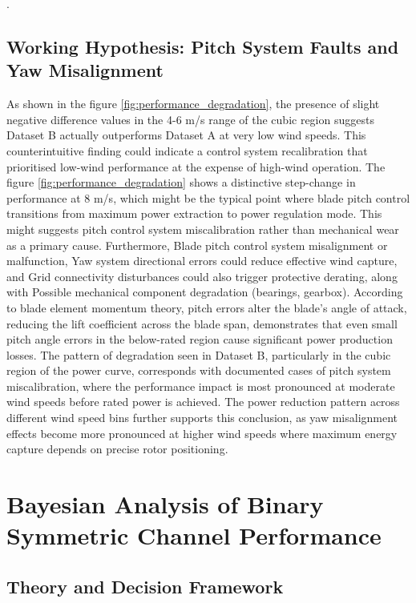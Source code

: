 .\documentclass[a4paper,11pt]{article}
\begin{document}
\subsection*{Working Hypothesis: Pitch System Faults and Yaw Misalignment}
As shown in the figure \ref{fig:performance_degradation}, the presence of slight negative difference values in the 4-6 m/s range of the cubic region suggests Dataset B actually outperforms Dataset A at very low wind speeds. This counterintuitive finding could indicate a control system recalibration that prioritised low-wind performance at the expense of high-wind operation. The  figure \ref{fig:performance_degradation} shows a distinctive step-change in performance at 8 m/s, which might be the typical point where blade pitch control transitions from maximum power extraction to power regulation mode. This might suggests pitch control system miscalibration rather than mechanical wear as a primary cause. Furthermore, Blade pitch control system misalignment or malfunction, Yaw system directional errors could reduce effective wind capture, and Grid connectivity disturbances could also trigger protective derating, along with Possible mechanical component degradation (bearings, gearbox). According to blade element momentum theory, pitch errors alter the blade's angle of attack, reducing the lift coefficient across the blade span, demonstrates that even small pitch angle errors in the below-rated region cause significant power production losses. The pattern of degradation seen in Dataset B, particularly in the cubic region of the power curve, corresponds with documented cases of pitch system miscalibration, where the performance impact is most pronounced at moderate wind speeds before rated power is achieved. The power reduction pattern across different wind speed bins further supports this conclusion, as yaw misalignment effects become more pronounced at higher wind speeds where maximum energy capture depends on precise rotor positioning. 

 
 

 \newpage
\section*{ Bayesian Analysis of Binary Symmetric Channel Performance}
\subsection*{Theory and Decision Framework}
\label{sec:theory}
\end{document}
